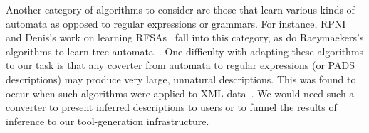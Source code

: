 

Another category of algorithms to consider 
are those that learn various kinds of
automata as opposed to regular expressions or grammars.
For instance, RPNI~\cite{rpni} and Denis's work on learning 
RFSAs~\cite{denis:learning-regular-languages} fall into this category,
as do Raeymaekers's algorithms to learn tree automata~\cite{raeymaekers+:learning-tree-languages,raeymaekers+:wrapper-induction}.
One difficulty with adapting these algorithms to our task is that 
any coverter from automata to regular expressions (or PADS descriptions)
may produce very large, unnatural descriptions.  This was found to occur 
when such algorithms were applied to XML data~\cite{bex+:dtd-inference}.
We would need such a converter to present inferred descriptions to users
or to funnel the results of inference to our tool-generation infrastructure.



  

